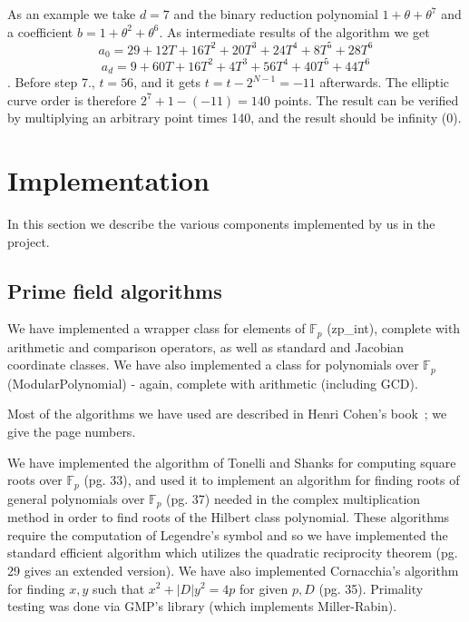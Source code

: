 \documentclass[11pt,english]{article}
\begin{document}
As an example we take $d=7$ and the binary reduction polynomial $1+\theta+\theta^7$ and a coefficient $b=1+\theta^2+\theta^6$. As intermediate results of the algorithm we get 
\begin{displaymath}a_0=29+12T+16T^2+20T^3+24T^4+8T^5+28T^6\end{displaymath}
\begin{displaymath}a_d=9+60T+16T^2+4T^3+56T^4+40T^5+44T^6\end{displaymath}.
Before step 7., $t=56$, and it gets $t=t-2^{N-1}=-11$ afterwards. The elliptic curve order is therefore $2^7+1-(-11)=140$ points. The result can be verified by multiplying an arbitrary point times 140, and the result should be infinity ($0$).

\section{Implementation}
In this section we describe the various components implemented by us in the project.
\subsection{Prime field algorithms}
We have implemented a wrapper class for elements of $\mathbb{F}_p$ (zp\_int), complete with arithmetic and comparison operators, as
well as standard and Jacobian coordinate classes. We have also implemented a class for polynomials over $\mathbb{F}_p$ (ModularPolynomial) - again, complete with arithmetic (including GCD).

Most of the algorithms we have used are described in Henri Cohen's book~\cite{Co96}; we give the page numbers.

We have implemented the algorithm of Tonelli and Shanks for computing square roots over $\mathbb{F}_p$ (pg. 33), and used 
it to implement an algorithm for finding roots of general polynomials over $\mathbb{F}_p$ (pg. 37) needed in the complex multiplication
method in order to find roots of the Hilbert class polynomial. These algorithms require the computation of Legendre's symbol
and so we have implemented the standard efficient algorithm which utilizes the quadratic reciprocity theorem (pg. 29 gives an extended version).
We have also implemented Cornacchia's algorithm for finding $x,y$ such that $x^2+|D|y^2=4p$ for given $p,D$ (pg. 35).
Primality testing was done via GMP's library (which implements Miller-Rabin). 
\end{document}
